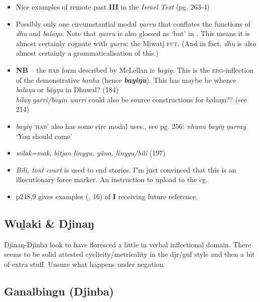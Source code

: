 \begin{itemize}
\begin{itemize}
	\end{itemize}
\item Nice examples of remote past \textbf{III} in the \textit{Israel Text} (pg. 263-4)
	\item Possibly only one circumstantial modal \textit{ŋarru} that conflates the functions of \textit{dhu} and \textit{balaŋu}. Note that \textit{ŋarru }is also glossed as `but' in \lastx. This means it is almost certainly cognate with \textit{yurru}: the Miwatj \textsc{fut}. (And in fact, \textit{dhu} is also almost certainly a grammaticalisation of this.)
	\item \textbf{NB} -- the \textsc{hab} form described by McLellan is \textit{bayiŋ}. This is the \textsc{erg}-inflection of the demonstrative \textit{banha} (hence \textit{\textbf{bayiŋu}}). This has maybe be whence \textit{balaŋu} or \textit{bäyŋu} in Dhuwal? (184)\\
	\textit{bilaŋ garri/bayin warri} could also be source constructions for balaŋu?? (see 214)
	\item \textit{bayiŋ} `\textsc{hab'} also has some circ modal uses., see pg. 256: \textit{nhunu bayiŋ ŋarray} `You should come'
	\item \textit{wilak=mak}, \textit{bitjan ḻinygu, yäna, ḻinygu/bili} (197)\\
	\item \textit{Bili, tout court} is used to end stories. I"m just convinced that this is an illocutionary force marker. An instruction to upload to the cg. 
	\item p248,9 gives examples (, 16) of \textbf{I} receiving future reference.
\end{itemize}


\subsection{Wuḻaki \& Djinaŋ}


Djinaŋ-Djinba look to have floresced a little in verbal inflectional domain. There seems to be solid attested cyclicity/metricality in the djr/guf style and then a bit of extra stuff. Unsure what happens under negation. 

\subsection{Ganalbingu (Djinba)}
